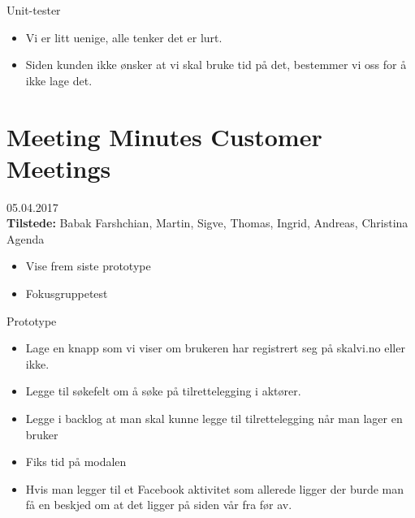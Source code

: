 {\large{Unit-tester}}
\begin{itemize}  
    \item Vi er litt uenige, alle tenker det er lurt.
    \item Siden kunden ikke ønsker at vi skal bruke tid på det, bestemmer vi oss for å ikke lage det.
\end{itemize}




\section{Meeting Minutes Customer Meetings}
\label{meeting_minutes_customer_meetings}

{\huge{05.04.2017}}\\
\textbf{Tilstede:} Babak Farshchian, Martin, Sigve, Thomas, Ingrid, Andreas, Christina\\

{\Large{Agenda}}
\begin{itemize} 
    \item Vise frem siste prototype
    \item Fokusgruppetest
\end{itemize} 


{\large{Prototype}}
\begin{itemize}  
    \item Lage en knapp som vi viser om brukeren har registrert seg på skalvi.no eller ikke.
    \item Legge til søkefelt om å søke på tilrettelegging i aktører.
    \item Legge i backlog at man skal kunne legge til tilrettelegging når man lager en bruker
    \item Fiks tid på modalen
    \item Hvis man legger til et Facebook aktivitet som allerede ligger der burde man få en beskjed om at det ligger på siden vår fra før av.
\end{itemize}


